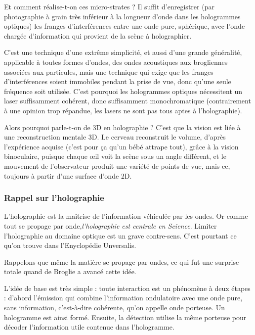 \documentclass[a4paper,12pt]{article}
\begin{document}
Et comment réalise-t-on ces micro-strates ? Il suffit d'enregistrer (par photographie à grain très inférieur à la longueur d'onde dans les hologrammes optiques) les franges d'interférences entre une onde pure, sphérique, avec l'onde chargée d'information qui provient de la scène à holographier. 


C'est une technique d'une extrême simplicité, et aussi d'une grande généralité, applicable à toutes formes d'ondes, des ondes acoustiques aux brogliennes associées aux particules, mais une  technique qui exige que les franges d'interférences soient immobiles pendant la prise de vue, donc qu'une seule fréquence soit utilisée. C'est pourquoi les hologrammes optiques nécessitent un laser suffisamment cohérent, donc suffisamment monochromatique (contrairement à une opinion trop répandue, les lasers ne sont pas tous aptes à l'holographie).



Alors pourquoi parle-t-on de 3D en holographie ? C'est que la vision est liée à une reconstruction mentale 3D. Le cerveau reconstruit le volume, d'après l'expérience acquise (c'est pour ça qu'un bébé attrape tout), grâce à la vision binoculaire, puisque chaque œil voit la scène sous un angle différent, et le mouvement de l'observateur produit une variété de points de vue, mais ce, toujours à partir d'une surface d'onde 2D.



\subsubsection{Rappel sur l'holographie}

L'holographie est la ma\^itrise de l'information véhiculée par les ondes. Or comme tout se propage par onde,\textit {l'holographie est centrale en Science}. Limiter l'holographie au domaine optique est un grave contre-sens. C'est pourtant ce qu'on trouve dans l'Enyclopédie Unversalis. 



Rappelons que même la matière se propage par ondes, ce qui fut une surprise totale quand de Broglie a avancé cette idée. 



L'idée de base est très simple : toute interaction est un phénomène à deux étapes : d'abord l'émission qui combine l'information ondulatoire avec une onde pure, sans information, c'est-à-dire cohérente, qu'on appelle onde porteuse. Un hologramme est ainsi formé. Ensuite, la détection utilise la même porteuse pour décoder l'information utile contenue dans l'hologramme.
\end{document}
